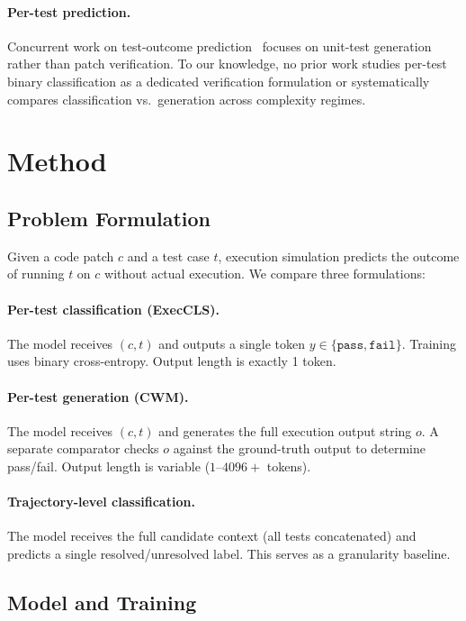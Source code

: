 \documentclass[11pt,a4paper]{article}
\newcommand{\ours}{ExecCLS}
\newcommand{\cwm}{CWM}
\begin{document}
\paragraph{Per-test prediction.}
Concurrent work on test-outcome prediction~\citep{testoutcome2025} focuses on unit-test generation rather than patch verification. To our knowledge, no prior work studies per-test binary classification as a dedicated verification formulation or systematically compares classification vs.\ generation across complexity regimes.

\section{Method}
\label{sec:method}

\subsection{Problem Formulation}

Given a code patch $c$ and a test case $t$, execution simulation predicts the outcome of running $t$ on $c$ without actual execution. We compare three formulations:

\paragraph{Per-test classification (\ours{}).} The model receives $(c, t)$ and outputs a single token $y \in \{\texttt{pass}, \texttt{fail}\}$. Training uses binary cross-entropy. Output length is exactly 1 token.

\paragraph{Per-test generation (\cwm{}).} The model receives $(c, t)$ and generates the full execution output string $o$. A separate comparator checks $o$ against the ground-truth output to determine pass/fail. Output length is variable ($1$--$4096+$ tokens).

\paragraph{Trajectory-level classification.} The model receives the full candidate context (all tests concatenated) and predicts a single resolved/unresolved label. This serves as a granularity baseline.

\subsection{Model and Training}
\end{document}
